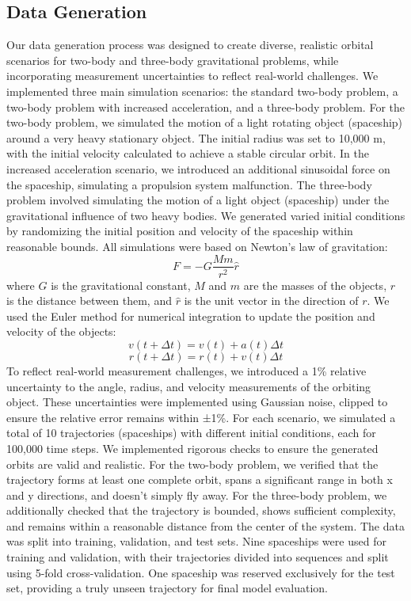 \documentclass[12pt,a4paper]{article}
\begin{document}
\subsection{Data Generation}
Our data generation process was designed to create diverse, realistic orbital scenarios for two-body and three-body gravitational problems, while incorporating measurement uncertainties to reflect real-world challenges. We implemented three main simulation scenarios: the standard two-body problem, a two-body problem with increased acceleration, and a three-body problem.
For the two-body problem, we simulated the motion of a light rotating object (spaceship) around a very heavy stationary object. The initial radius was set to 10,000 m, with the initial velocity calculated to achieve a stable circular orbit. In the increased acceleration scenario, we introduced an additional sinusoidal force on the spaceship, simulating a propulsion system malfunction.
The three-body problem involved simulating the motion of a light object (spaceship) under the gravitational influence of two heavy bodies. We generated varied initial conditions by randomizing the initial position and velocity of the spaceship within reasonable bounds.
All simulations were based on Newton's law of gravitation:
$$F = -G \frac{M m}{r^2} \hat{r}$$
where $G$ is the gravitational constant, $M$ and $m$ are the masses of the objects, $r$ is the distance between them, and $\hat{r}$ is the unit vector in the direction of $r$.
We used the Euler method for numerical integration to update the position and velocity of the objects:
\[v(t + \Delta t) = v(t) + a(t) \Delta t\]
\[r(t + \Delta t) = r(t) + v(t)\Delta t\]
To reflect real-world measurement challenges, we introduced a 1\% relative uncertainty to the angle, radius, and velocity measurements of the orbiting object. These uncertainties were implemented using Gaussian noise, clipped to ensure the relative error remains within ±1\%.
For each scenario, we simulated a total of 10 trajectories (spaceships) with different initial conditions, each for 100,000 time steps. We implemented rigorous checks to ensure the generated orbits are valid and realistic. For the two-body problem, we verified that the trajectory forms at least one complete orbit, spans a significant range in both x and y directions, and doesn't simply fly away. For the three-body problem, we additionally checked that the trajectory is bounded, shows sufficient complexity, and remains within a reasonable distance from the center of the system.
The data was split into training, validation, and test sets. Nine spaceships were used for training and validation, with their trajectories divided into sequences and split using 5-fold cross-validation. One spaceship was reserved exclusively for the test set, providing a truly unseen trajectory for final model evaluation.
\end{document}
